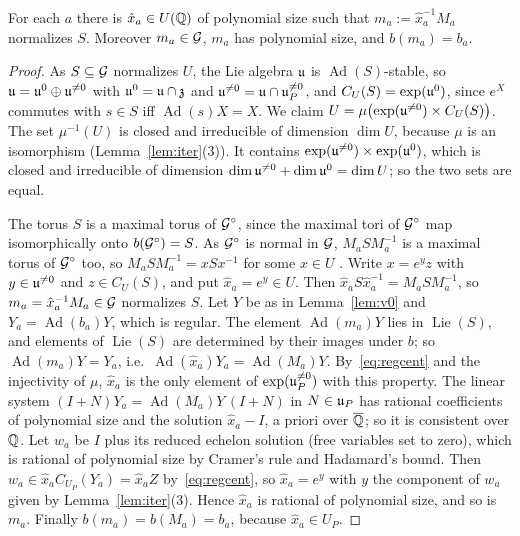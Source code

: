 \begin{lemma}\label{lem:xhat}
For each $a$ there is $\hat x_a\in U(\mathbb{Q})$ of polynomial size such that $m_a:=\hat x_a^{-1}M_a$ normalizes
$S$. Moreover $m_a\in\mathcal{G}$, $m_a$ has polynomial size, and $b(m_a)=b_a$.
\end{lemma}
\begin{proof}
As $S\subseteq\mathcal{G}$ normalizes $U$, the Lie algebra $\mathfrak{u}$ is $\operatorname{Ad}(S)$-stable, so
$\mathfrak{u}=\mathfrak{u}^0\oplus\mathfrak{u}^{\ne0}$ with $\mathfrak{u}^0=\mathfrak{u}\cap\mathfrak z$ and $\mathfrak{u}^{\ne0}=\mathfrak{u}\cap\mathfrak{u}_P^{\ne0}$, and
$C_U(S)=\exp(\mathfrak{u}^0)$, since $e^X$ commutes with $s\in S$ iff $\operatorname{Ad}(s)X=X$. We claim
$U=\mu\bigl(\exp(\mathfrak{u}^{\ne0})\times C_U(S)\bigr)$. The set $\mu^{-1}(U)$ is closed and irreducible of dimension
$\dim U$, because $\mu$ is an isomorphism (Lemma~\ref{lem:iter}(3)). It contains
$\exp(\mathfrak{u}^{\ne0})\times\exp(\mathfrak{u}^0)$, which is closed and irreducible of dimension
$\dim\mathfrak{u}^{\ne0}+\dim\mathfrak{u}^0=\dim U$; so the two sets are equal.

The torus $S$ is a maximal torus of $\mathcal{G}^\circ$, since the maximal tori of $\mathcal{G}^\circ$ map isomorphically onto
$b(\mathcal{G}^\circ)=S$. As $\mathcal{G}^\circ$ is normal in $\mathcal{G}$, $M_aSM_a^{-1}$ is a maximal torus of $\mathcal{G}^\circ$ too, so
$M_aSM_a^{-1}=xSx^{-1}$ for some $x\in U$ \cite[10.6]{Bor91}. Write $x=e^yz$ with $y\in\mathfrak{u}^{\ne0}$ and
$z\in C_U(S)$, and put $\hat x_a=e^y\in U$. Then $\hat x_aS\hat x_a^{-1}=M_aSM_a^{-1}$, so
$m_a=\hat x_a^{-1}M_a\in\mathcal{G}$ normalizes $S$. Let $Y$ be as in Lemma~\ref{lem:v0} and $Y_a=\operatorname{Ad}(b_a)Y$,
which is regular. The element $\operatorname{Ad}(m_a)Y$ lies in $\operatorname{Lie}(S)$, and elements of $\operatorname{Lie}(S)$ are determined by
their images under $b$; so $\operatorname{Ad}(m_a)Y=Y_a$, i.e.\ $\operatorname{Ad}(\hat x_a)Y_a=\operatorname{Ad}(M_a)Y$. By~\eqref{eq:regcent}
and the injectivity of $\mu$, $\hat x_a$ is the only element of $\exp(\mathfrak{u}_P^{\ne0})$ with this property.
The linear system $(I+N)Y_a=\operatorname{Ad}(M_a)Y\,(I+N)$ in $N\in\mathfrak{u}_P$ has rational coefficients of polynomial size
and the solution $\hat x_a-I$, a priori over $\overline{\mathbb{Q}}$; so it is consistent over $\mathbb{Q}$. Let $w_a$ be $I$ plus its
reduced echelon solution (free variables set to zero), which is rational of polynomial size by Cramer's
rule and Hadamard's bound. Then $w_a\in\hat x_aC_{U_P}(Y_a)=\hat x_aZ$ by~\eqref{eq:regcent}, so $\hat x_a=e^y$ with
$y$ the component of $w_a$ given by Lemma~\ref{lem:iter}(3). Hence $\hat x_a$ is rational of polynomial
size, and so is $m_a$. Finally $b(m_a)=b(M_a)=b_a$, because $\hat x_a\in U_P$.
\end{proof}

